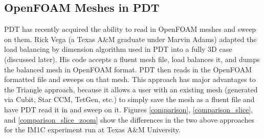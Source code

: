 \documentclass[11pt, letterpaper,titlepage,oneside]{article}
\begin{document}
\subsection{OpenFOAM Meshes in PDT}

PDT has recently acquired the ability to read in OpenFOAM meshes and sweep on them. Rick Vega (a Texas A\&M graduate under Marvin Adams) adapted the load balancing by dimension algorithm used in PDT into a fully 3D case (discussed later). His code accepts a fluent mesh file, load balances it, and dumps the balanced mesh in OpenFOAM format. PDT then reads in the OpenFOAM formatted file and sweeps on that mesh. This approach has major advantages to the Triangle approach, because it allows a user with an existing mesh (generated via Cubit, Star CCM, TetGen, etc.) to simply save the mesh as a fluent file and have PDT read it in and sweep on it. Figures \ref{comparison}, \ref{comparison_slice}, and \ref{comparison_slice_zoom} show the differences in the two above approaches for the IM1C experiment run at Texas A\&M University.
\end{document}
